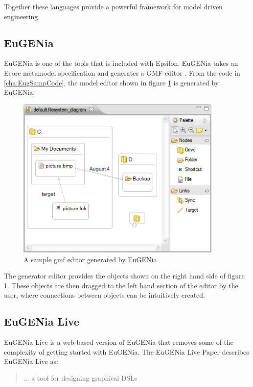 Together these languages provide a powerful framework for model driven engineering.

\subsection{EuGENia}
EuGENia is one of the tools that is included with Epsilon. EuGENia takes an Ecore metamodel specification and generates a GMF editor \citep{eugeniaSite}. From the code in \ref{cha:EugSampCode}, the model editor shown in figure \ref{sampleGmf} is generated by EuGENia.

\begin{figure}
\begin{center}
	\includegraphics[width=4in]{figures/gmfeditor.png}
\end{center}
\caption{A sample gmf editor generated by EuGENia \citep{eugeniaSite}}
\label{sampleGmf}
\end{figure}

The generator editor provides the objects shown on the right hand side of figure \ref{sampleGmf}. These objects are then dragged to the left hand section of the editor by the user, where connections between objects can be intuitively created. 

\subsection{EuGENia Live}

EuGENia Live is a web-based version of EuGENia that removes some of the complexity of getting started with EuGENia. The EuGENia Live Paper \citep{eugeniaLivePaper} describes EuGENia Live as: \begin{quote}... a tool for designing graphical DSLs  \end{quote}

